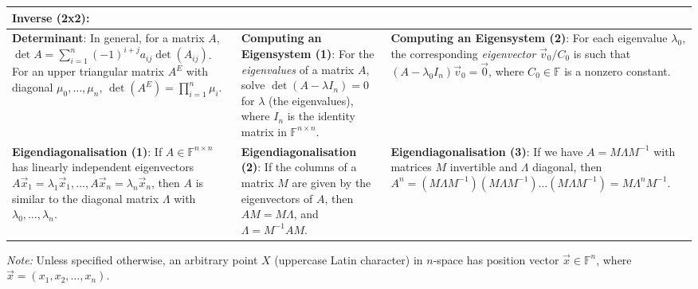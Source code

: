 \begin{tabular}{|m{.31\linewidth}|m{.31\linewidth}|m{.31\linewidth}|}
\textbf{Inverse (2x2)}:
    \smash{$\displaystyle
        A = \begin{pmatrix}
            a & b \\
            c & d
        \end{pmatrix},\,
        A^{-1} = \frac{1}{\det A}
        \begin{pmatrix}
            d & -b \\
            -c & a
        \end{pmatrix}
    $} \\

\hline

\textbf{Determinant}:
    In general, for a matrix $ A $, $ \det A = \sum_{i=1}^n (-1)^{i+j} a_{ij}
    \det(A_{ij}) $. For an upper triangular matrix $ A^E $ with diagonal $
    \mu_0, \ldots, \mu_n $, $ \det\left(A^E\right) = \prod_{i=1}^n \mu_i $. &

\textbf{Computing an Eigensystem (1)}:
    For the \emph{eigenvalues} of a matrix $ A $, solve $ \det(A-\lambda
    I_n) = 0 $ for $ \lambda $ (the eigenvalues), where $ I_n $ is the identity
    matrix in $ \mathbb{F}^{n \times n} $. &

\textbf{Computing an Eigensystem (2)}:
    For each eigenvalue $ \lambda_0 $, the corresponding \emph{eigenvector} $
    \vec{v}_0/C_0 $ is such that $ (A - \lambda_0 I_n) \vec{v}_0 = \vec{0} $,
    where $ C_0 \in \mathbb{F} $ is a nonzero constant. \\

\hline

\textbf{Eigendiagonalisation (1)}:
    If $ A \in \mathbb{F}^{n \times n} $ has linearly independent eigenvectors $
    A\vec{x}_1 = \lambda_1\vec{x}_1, \ldots, A\vec{x}_n = \lambda_n\vec{x}_n $,
    then $ A $ is similar to the diagonal matrix $ \Lambda $ with $ \lambda_0,
    \ldots, \lambda_n $. &

\textbf{Eigendiagonalisation (2)}:
    If the columns of a matrix $ M $ are given by the eigenvectors of $ A $,
    then $ AM = M\Lambda $, and $ \Lambda = M^{-1}AM $. &

\textbf{Eigendiagonalisation (3)}:
    If we have $ A = M \Lambda M^{-1} $ with matrices $ M $ invertible and $
    \Lambda $ diagonal, then $ A^n = (M \Lambda M^{-1})(M \Lambda M^{-1}) \ldots
    (M \Lambda M^{-1}) = M \Lambda^n M^{-1} $. \\

\hline
\end{tabular}

\vfill
\emph{Note:} Unless specified otherwise, an arbitrary point $ X $ (uppercase
Latin character) in $ n $-space has position vector $ \vec{x} \in \mathbb{F}^n
$, where $ \vec{x} = (x_1, x_2, \ldots, x_n) $.
\vfill

